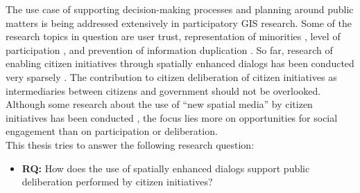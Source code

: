 The use case of supporting decision-making processes and planning around public matters is being addressed extensively in participatory GIS research. Some of the research topics in question are user trust, representation of minorities \cite{Carver2001_PPGIS_Cyberdemocracy}, level of participation \cite{Steinmann2005_Combination_Ladder_GIS}, and prevention of information duplication \cite{Hopfer2007_Communication}. So far, research of enabling citizen initiatives through spatially enhanced dialogs has been conducted very sparsely \cite{Cai2009_spatial_annotation_deliberation}. The contribution to citizen deliberation of citizen initiatives as intermediaries between citizens and government should not be overlooked. Although some research about the use of ``new spatial media'' by citizen initiatives has been conducted \cite{Elwood2013_NewSpatialMedia}, the focus lies more on opportunities for social engagement than on participation or deliberation.\\
This thesis tries to answer the following research question:
\begin{itemize}
  \item[] \textbf{RQ:} How does the use of spatially enhanced dialogs support public deliberation performed by citizen initiatives?
\end{itemize}

